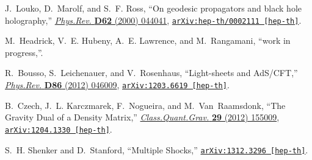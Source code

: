 \documentclass[12pt]{article}
\begin{document}
\begin{thebibliography}{10}
J.~Louko, D.~Marolf, and S.~F. Ross, ``{On geodesic propagators and black hole
  holography},'' \href{http://dx.doi.org/10.1103/PhysRevD.62.044041}{{\em
  Phys.Rev.} {\bf D62} (2000)  044041},
\href{http://arxiv.org/abs/hep-th/0002111}{{\tt arXiv:hep-th/0002111
  [hep-th]}}.

M.~Headrick, V.~E. Hubeny, A.~E. Lawrence, and M.~Rangamani, ``work in
  progress,''.

R.~Bousso, S.~Leichenauer, and V.~Rosenhaus, ``{Light-sheets and AdS/CFT},''
  \href{http://dx.doi.org/10.1103/PhysRevD.86.046009}{{\em Phys.Rev.} {\bf D86}
  (2012)  046009},
\href{http://arxiv.org/abs/1203.6619}{{\tt arXiv:1203.6619 [hep-th]}}.

B.~Czech, J.~L. Karczmarek, F.~Nogueira, and M.~Van~Raamsdonk, ``{The Gravity
  Dual of a Density Matrix},''
  \href{http://dx.doi.org/10.1088/0264-9381/29/15/155009}{{\em
  Class.Quant.Grav.} {\bf 29} (2012)  155009},
\href{http://arxiv.org/abs/1204.1330}{{\tt arXiv:1204.1330 [hep-th]}}.

S.~H. Shenker and D.~Stanford, ``{Multiple Shocks},''
\href{http://arxiv.org/abs/1312.3296}{{\tt arXiv:1312.3296 [hep-th]}}.

\end{thebibliography}\endgroup
\end{document}
